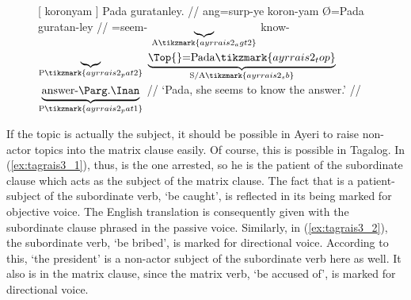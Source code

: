 \begin{figure}
\ex\label{ex:ayrrais2}\begingl[aboveglcskip=1.5em, aboveglftskip=2.5em]
	 \textup{[} {} koronyam {} \textup{]} Pada
		guratanley. //
	\glb ang=surp-ye {} {} koron-yam {} {} Ø=Pada guratan-ley //
	\glc \Aarg{}=seem-\TsgF{}%
		{}
		$\underbrace{}_{\text{A}%
			\tikzmark{ayrrais2_agt2}%
		}$
		know-\Ptcp{}
		$\underbrace{}_{\text{P}%
			\tikzmark{ayrrais2_pat2}%
		}$
		{}
		$\underbrace{\text{\Top{}=Pada}%
			\tikzmark{ayrrais2_top}%
		}_{\text{S/A}%
			\tikzmark{ayrrais2_sb}%
		}$
		$\underbrace{\text{answer-\PargI{}}}_{\text{P}%
			\tikzmark{ayrrais2_pat1}%
		}$
		//
	\glft `Pada, she seems to know the answer.' //
\endgl
{}

\xe
\end{figure}

If the topic is actually the subject, it should be possible in Ayeri to raise
non-actor topics into the matrix clause easily. Of course, this is possible in
Tagalog. In (\ref{ex:tagrais3_1}), thus,  is the one arrested, so he
is the patient of the subordinate clause which acts as the subject of the
matrix clause. The fact that  is a patient-subject of the
subordinate verb,  `be caught', is reflected in its being marked
for objective voice. The English translation is consequently given with the
subordinate clause phrased in the passive voice. Similarly, in
(\ref{ex:tagrais3_2}), the subordinate verb,  `be bribed', is
marked for directional voice. According to this,  `the
president' is a non-actor subject of the subordinate verb here as well. It also
is in the matrix clause, since the matrix verb,  `be accused
of', is marked for directional voice.

